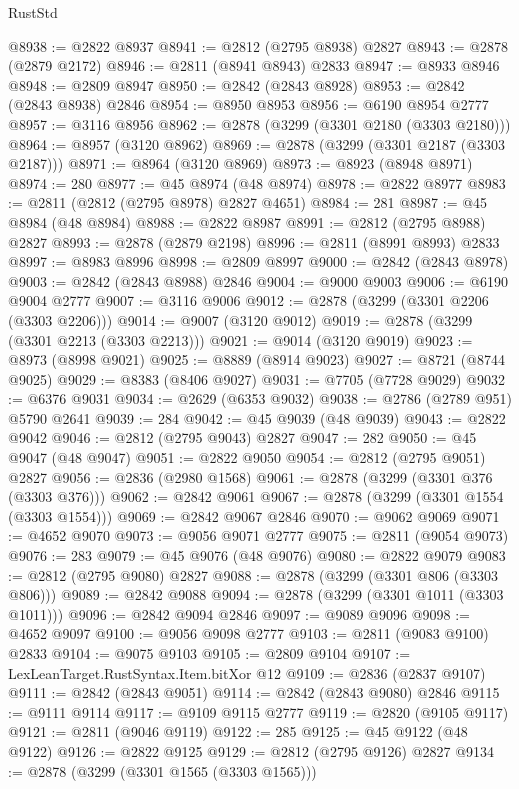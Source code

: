 \begin{lexlean}{RustStd}
\begin{coremodule}
@8938 := @2822 @8937
@8941 := @2812 (@2795 @8938) @2827
@8943 := @2878 (@2879 @2172)
@8946 := @2811 (@8941 @8943) @2833
@8947 := @8933 @8946
@8948 := @2809 @8947
@8950 := @2842 (@2843 @8928)
@8953 := @2842 (@2843 @8938) @2846
@8954 := @8950 @8953
@8956 := @6190 @8954 @2777
@8957 := @3116 @8956
@8962 := @2878 (@3299 (@3301 @2180 (@3303 @2180)))
@8964 := @8957 (@3120 @8962)
@8969 := @2878 (@3299 (@3301 @2187 (@3303 @2187)))
@8971 := @8964 (@3120 @8969)
@8973 := @8923 (@8948 @8971)
@8974 := 280
@8977 := @45 @8974 (@48 @8974)
@8978 := @2822 @8977
@8983 := @2811 (@2812 (@2795 @8978) @2827 @4651)
@8984 := 281
@8987 := @45 @8984 (@48 @8984)
@8988 := @2822 @8987
@8991 := @2812 (@2795 @8988) @2827
@8993 := @2878 (@2879 @2198)
@8996 := @2811 (@8991 @8993) @2833
@8997 := @8983 @8996
@8998 := @2809 @8997
@9000 := @2842 (@2843 @8978)
@9003 := @2842 (@2843 @8988) @2846
@9004 := @9000 @9003
@9006 := @6190 @9004 @2777
@9007 := @3116 @9006
@9012 := @2878 (@3299 (@3301 @2206 (@3303 @2206)))
@9014 := @9007 (@3120 @9012)
@9019 := @2878 (@3299 (@3301 @2213 (@3303 @2213)))
@9021 := @9014 (@3120 @9019)
@9023 := @8973 (@8998 @9021)
@9025 := @8889 (@8914 @9023)
@9027 := @8721 (@8744 @9025)
@9029 := @8383 (@8406 @9027)
@9031 := @7705 (@7728 @9029)
@9032 := @6376 @9031
@9034 := @2629 (@6353 @9032)
@9038 := @2786 (@2789 @951) @5790 @2641
@9039 := 284
@9042 := @45 @9039 (@48 @9039)
@9043 := @2822 @9042
@9046 := @2812 (@2795 @9043) @2827
@9047 := 282
@9050 := @45 @9047 (@48 @9047)
@9051 := @2822 @9050
@9054 := @2812 (@2795 @9051) @2827
@9056 := @2836 (@2980 @1568)
@9061 := @2878 (@3299 (@3301 @376 (@3303 @376)))
@9062 := @2842 @9061
@9067 := @2878 (@3299 (@3301 @1554 (@3303 @1554)))
@9069 := @2842 @9067 @2846
@9070 := @9062 @9069
@9071 := @4652 @9070
@9073 := @9056 @9071 @2777
@9075 := @2811 (@9054 @9073)
@9076 := 283
@9079 := @45 @9076 (@48 @9076)
@9080 := @2822 @9079
@9083 := @2812 (@2795 @9080) @2827
@9088 := @2878 (@3299 (@3301 @806 (@3303 @806)))
@9089 := @2842 @9088
@9094 := @2878 (@3299 (@3301 @1011 (@3303 @1011)))
@9096 := @2842 @9094 @2846
@9097 := @9089 @9096
@9098 := @4652 @9097
@9100 := @9056 @9098 @2777
@9103 := @2811 (@9083 @9100) @2833
@9104 := @9075 @9103
@9105 := @2809 @9104
@9107 := LexLeanTarget.RustSyntax.Item.bitXor @12
@9109 := @2836 (@2837 @9107)
@9111 := @2842 (@2843 @9051)
@9114 := @2842 (@2843 @9080) @2846
@9115 := @9111 @9114
@9117 := @9109 @9115 @2777
@9119 := @2820 (@9105 @9117)
@9121 := @2811 (@9046 @9119)
@9122 := 285
@9125 := @45 @9122 (@48 @9122)
@9126 := @2822 @9125
@9129 := @2812 (@2795 @9126) @2827
@9134 := @2878 (@3299 (@3301 @1565 (@3303 @1565)))

\end{coremodule}
\end{lexlean}
